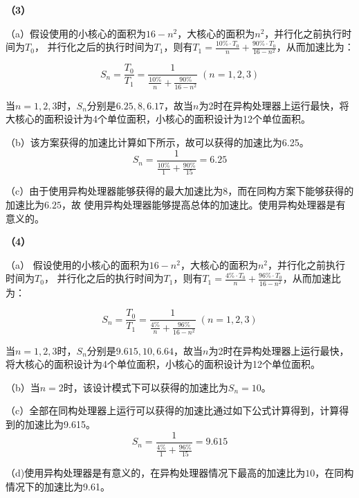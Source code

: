 \documentclass[12pt]{article}
\begin{document}
\textbf{（3）}

	（a）假设使用的小核心的面积为$16-n^{2}$，大核心的面积为$n^{2}$，并行化之前执行时间为$T_{0}$，
	并行化之后的执行时间为$T_1$，则有$T_1 = \frac{ 10\% \cdot T_0}{n}+\frac{90\% \cdot T_0}{16-n^{2}}$，从而加速比为：

	\begin{equation}
		S_{n} = \frac{T_0}{T_1}=\frac{1}{\frac{ 10\%}{n}+\frac{90\%}{16-n^{2}}}\;(n=1,2,3)
	\end{equation}

	当$n=1,2,3$时，$S_n$分别是$6.25,8,6.17$，故当$n$为2时在异构处理器上运行最快，将大核心的面积设计为4个单位面积，小核心的面积设计为12个单位面积。

	（b）该方案获得的加速比计算如下所示，故可以获得的加速比为6.25。
	\begin{equation}
		S_n=\frac{1}{\frac{ 10\%}{1}+\frac{90\%}{15}}=6.25
	\end{equation}

	（c）由于使用异构处理器能够获得的最大加速比为$8$，而在同构方案下能够获得的加速比为$6.25$，故
	使用异构处理器能够提高总体的加速比。使用异构处理器是有意义的。

	
\textbf{（4）}

	
	（a） 假设使用的小核心的面积为$16-n^{2}$，大核心的面积为$n^{2}$，并行化之前执行时间为$T_{0}$，
	并行化之后的执行时间为$T_1$，则有$T_1 = \frac{ 4\% \cdot T_0}{n}+\frac{96\% \cdot T_0}{16-n^{2}}$，从而加速比为：

	\begin{equation}
		S_{n} = \frac{T_0}{T_1}=\frac{1}{\frac{ 4\%}{n}+\frac{96\%}{16-n^{2}}}\;(n=1,2,3)
	\end{equation}

	当$n=1,2,3$时，$S_n$分别是$9.615,10,6.64$，故当$n$为2时在异构处理器上运行最快，将大核心的面积设计为4个单位面积，小核心的面积设计为12个单位面积。

	（b）当$n=2$时，该设计模式下可以获得的加速比为$S_n=10$。

	（c）全部在同构处理器上运行可以获得的加速比通过如下公式计算得到，计算得到的加速比为9.615。
	\begin{equation}
		S_n=\frac{1}{\frac{ 4\%}{1}+\frac{96\%}{15}}=9.615
	\end{equation}

	（d)使用异构处理器是有意义的，在异构处理器情况下最高的加速比为$10$，在同构情况下的加速比为9.61。
\end{document}
